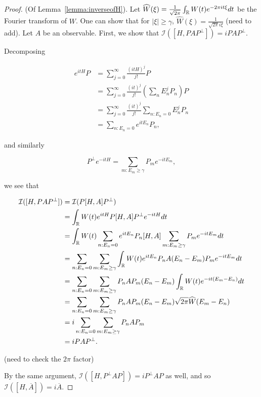 \documentclass[12pt, letterpaper]{article}
\begin{document}
\begin{proof}
(Of Lemma~\ref{lemma:inverseofH}). Let $\widehat{W}(\xi) = \frac{1}{\sqrt{2\pi}}\int_{\mathbb{R}} W(t) e^{-2\pi i t \xi} dt$ be the Fourier transform of $W$. One can show that for $|\xi|\geq \gamma$, $\widehat{W}(\xi) = \frac{1}{\sqrt{2\pi}i \xi}$ (need to add). Let $A$ be an observable. First, we show that $\mathcal{I}([H,PAP^\perp]) = iPAP^\perp$. 

Decomposing 

\[\begin{aligned}
e^{itH}P &= \sum_{j=0}^\infty \frac{(itH)^j}{j!} P \\
&= \sum_{j =0}^\infty \frac{(it)^j}{j!} \left(\sum_n E_n^j P_n\right)P \\
&= \sum_{j=0}^\infty \frac{(it)^j}{j!} \sum_{n : E_n=0} E_n^j P_n \\
&= \sum_{n : E_n=0} e^{itE_n}P_n,
\end{aligned}\]

and similarly 

\[P^\perp e^{-itH}= \sum_{m:E_m \geq \gamma}P_m e^{-itE_m},\]

we see that

\[\begin{aligned}
\mathcal{I}([H,PAP^\perp]) &= \mathcal{I}(P[H,A]P^\perp) \\
&= \int_{\mathbb{R}} W(t)e^{itH}P[H,A]P^\perp e^{-itH}dt \\
&= \int_{\mathbb{R}} W(t) \sum_{n : E_n=0} e^{itE_n}P_n [H,A] \sum_{m:E_m \geq \gamma} P_m e^{-itE_m} dt\\
&= \sum_{n : E_n=0} \sum_{m:E_m \geq \gamma} \int_{\mathbb{R}} W(t) e^{itE_n} P_n A (E_n-E_m) P_m e^{-itE_m}dt\\
&= \sum_{n : E_n=0} \sum_{m:E_m \geq \gamma} P_n A P_m (E_n-E_m) \int_{\mathbb{R}} W(t) e^{-it(E_m - E_n)} dt\\
&= \sum_{n : E_n=0} \sum_{m:E_m \geq \gamma} P_n A P_m (E_n-E_m) \sqrt{2\pi} \widehat{W}(E_m-E_n) \\
&= i\sum_{n : E_n=0} \sum_{m:E_m \geq \gamma} P_n A P_m\\
&= iPAP^\perp.
\end{aligned}\]

(need to check the $2\pi$ factor)

By the same argument, $\mathcal{I}([H,P^\perp AP]) = iP^\perp AP$ as well, and so $\mathcal{I}([H,\overline{A}]) = i\overline{A}$.
\end{proof}
\end{document}
